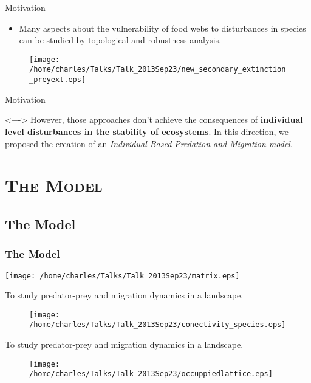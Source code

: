 \documentclass[xcolor=x11names,compress]{beamer}
\renewcommand{\(}{\begin{columns}}
\renewcommand{\)}{\end{columns}}
\newcommand{\<}[1]{\begin{column}{#1}}
\renewcommand{\>}{\end{column}}
\begin{document}
\begin{frame}{Motivation}
\begin{itemize}
\item Many aspects about the vulnerability of food webs to disturbances in species can be studied by topological and robustness analysis.
\end{itemize}
\begin{figure}
\texttt{[image: /home/charles/Talks/Talk\_2013Sep23/new\_secondary\_extinction\_preyext.eps]}
\end{figure}
\end{frame}



\begin{frame}{Motivation}
\begin{block}<+->{}
However, those approaches don't achieve the consequences of \textbf{individual level disturbances in the stability of ecosystems}. In this direction, we proposed the creation of an \emph{Individual Based Predation and Migration model}.
\end{block} 
\end{frame}

\section{\scshape The Model}

\subsection{The Model}

\begin{frame}
\frametitle{The Model}
\texttt{[image: /home/charles/Talks/Talk\_2013Sep23/matrix.eps]}
\end{frame}

\begin{frame}
\centering To study predator-prey and migration dynamics in a landscape.
\begin{figure}
\centering \texttt{[image: /home/charles/Talks/Talk\_2013Sep23/conectivity\_species.eps]}
\end{figure}
\end{frame}

\begin{frame}
\centering To study predator-prey and migration dynamics in a landscape.
\begin{figure}
\centering \texttt{[image: /home/charles/Talks/Talk\_2013Sep23/occuppiedlattice.eps]}
\end{figure}
\end{frame}
\end{document}
